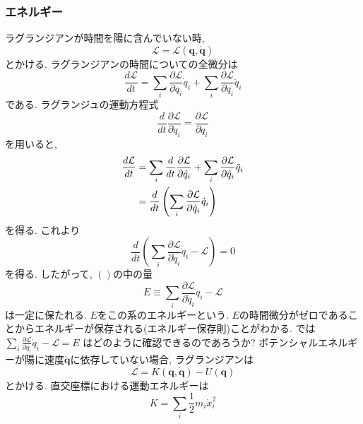 \subsubsection{エネルギー}
ラグランジアンが時間を陽に含んでいない時,
\begin{equation}
 \mathcal{L} = \mathcal{L}(\bm{q}, \dot{\bm{q}})
\end{equation}
とかける.
ラグランジアンの時間についての全微分は
\begin{equation}
 \frac{d \mathcal{L}}{d t}
=\sum_{i}\frac{\partial \mathcal{L}}{\partial q_{i}} \dot{q}_{i}
+\sum_{i}\frac{\partial \mathcal{L}}{\partial q_{i}} \ddot{q}_{i}
\end{equation}
である.
ラグランジュの運動方程式
\begin{equation}
 \frac{d}{dt}
 \frac{\partial \mathcal{L}}{\partial \dot{q}_{i}}
=\frac{\partial \mathcal{L}}{\partial q_{i}}
\end{equation}
を用いると,
\begin{align}
  \frac{d \mathcal{L}}{dt}
&=\sum_{i} \frac{d}{dt} \frac{\partial \mathcal{L}}{\partial \dot{q}_{i}}
 +\sum_{i} \frac{\partial \mathcal{L}}{\partial \dot{q}_{i}} \ddot{q}_{i}
  \notag
  \\
 &=\frac{d}{dt} \left(\sum_{i} \frac{\partial \mathcal{L}}{\partial \dot{q}_{i}} \dot{q}_{i} \right)
\end{align}
を得る.
これより
\begin{equation}
 \frac{d}{dt}
 \left(
        \sum_{i} \frac{\partial \mathcal{L}}{\partial \dot{q}_{i}} \dot{q}_{i} - \mathcal{L}
 \right)
=0
\end{equation}
を得る.
したがって, $()$の中の量
\begin{equation}
 E \equiv \sum_{i} \frac{\partial \mathcal{L}}{\partial \dot{q}_{i}} \dot{q}_{i} - \mathcal{L}
\end{equation}
は一定に保たれる.
$E$をこの系のエネルギーという.
$E$の時間微分がゼロであることからエネルギーが保存される(エネルギー保存則)ことがわかる.
では
$\sum_{i}\frac{\partial \mathcal{L}}{\partial \dot{q}_{i}} \dot{q}_{i} -\mathcal{L} = E$
はどのように確認できるのであろうか?
ポテンシャルエネルギーが陽に速度$\dot{\bm{q}}$に依存していない場合, ラグランジアンは
\begin{equation}
 \mathcal{L}
= K(\bm{q}, \dot{\bm{q}}) - U(\bm{q})
\end{equation}
とかける. 直交座標における運動エネルギーは
\begin{equation}
 K = \sum_{i} \frac{1}{2} m_{i} \dot{x}_{i}^{2}
\end{equation}
